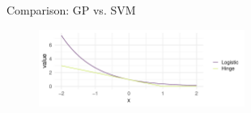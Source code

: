 \begin{frame}[c,allowframebreaks]{Comparison: GP vs. SVM}
\begin{figure}
\includegraphics[width=0.6\textwidth]{figure/los-exp-plot-1.pdf}
\end{figure}
\framebreak



\framebreak



\framebreak



\framebreak



\framebreak



\framebreak



\framebreak

\end{frame}

